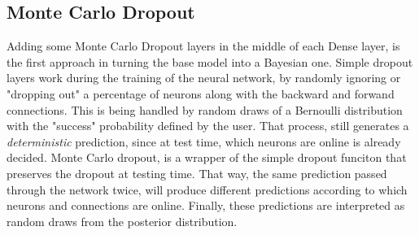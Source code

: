 \documentclass[11pt,twoside]{article}
\numberwithin{Theorem}{section}
\numberwithin{Definition}{section}
\numberwithin{Lemma}{section}
\numberwithin{Algorithm}{section}
\numberwithin{equation}{section}
\begin{document}
\subsection{Monte Carlo Dropout}
\label{sec:BNN}

Adding some Monte Carlo Dropout layers in the middle of each Dense layer, is the first approach in turning the base model into a Bayesian one. Simple dropout layers work during the training of the neural network, by randomly ignoring or "dropping out" a percentage of neurons along with the backward and forwand connections. This is being handled by random draws of a Bernoulli distribution with the "success" probability defined by the user. That process, still generates a \textit{deterministic} prediction, since at test time, which neurons are online is already decided. Monte Carlo dropout, is a wrapper of the simple dropout funciton that preserves the dropout at testing time. That way, the same prediction passed through the network twice, will produce different predictions according to which neurons and connections are online. Finally, these predictions are interpreted as random draws from the posterior distribution.
\end{document}
